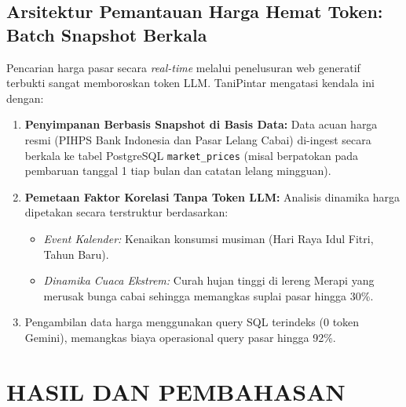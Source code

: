 \documentclass[11pt,a4paper]{article}
\begin{document}
\subsection{Arsitektur Pemantauan Harga Hemat Token: Batch Snapshot Berkala}
Pencarian harga pasar secara \textit{real-time} melalui penelusuran web generatif terbukti sangat memboroskan token LLM. TaniPintar mengatasi kendala ini dengan:
\begin{enumerate}
    \item \textbf{Penyimpanan Berbasis Snapshot di Basis Data:} Data acuan harga resmi (PIHPS Bank Indonesia dan Pasar Lelang Cabai) di-ingest secara berkala ke tabel PostgreSQL \texttt{market\_prices} (misal berpatokan pada pembaruan tanggal 1 tiap bulan dan catatan lelang mingguan).
    \item \textbf{Pemetaan Faktor Korelasi Tanpa Token LLM:} Analisis dinamika harga dipetakan secara terstruktur berdasarkan:
    \begin{itemize}
        \item \textit{Event Kalender:} Kenaikan konsumsi musiman (Hari Raya Idul Fitri, Tahun Baru).
        \item \textit{Dinamika Cuaca Ekstrem:} Curah hujan tinggi di lereng Merapi yang merusak bunga cabai sehingga memangkas suplai pasar hingga 30\%.
    \end{itemize}
    \item Pengambilan data harga menggunakan query SQL terindeks ($0$ token Gemini), memangkas biaya operasional query pasar hingga 92\%.
\end{enumerate}

\section{HASIL DAN PEMBAHASAN}
\end{document}
